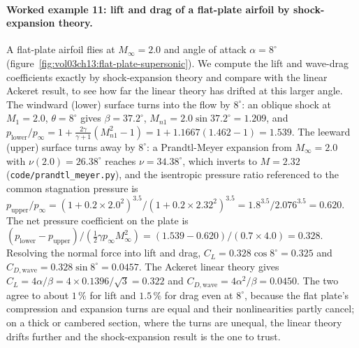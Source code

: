 \paragraph{Worked example 11: lift and drag of a flat-plate airfoil by
shock-expansion theory.} A flat-plate airfoil flies at $M_\infty = 2.0$
and angle of attack $\alpha = 8^{\circ}$
(figure~\ref{fig:vol03ch13:flat-plate-supersonic}). We compute the lift
and wave-drag coefficients exactly by shock-expansion theory and
compare with the linear Ackeret result, to see how far the linear
theory has drifted at this larger angle. The windward (lower) surface
turns into the flow by $8^{\circ}$: an oblique shock at
$M_1 = 2.0$, $\theta = 8^{\circ}$ gives $\beta = 37.2^{\circ}$,
$M_{n1} = 2.0 \sin 37.2^{\circ} = 1.209$, and
$p_{\text{lower}}/p_\infty = 1 + \frac{2\gamma}{\gamma + 1}
(M_{n1}^2 - 1) = 1 + 1.1667(1.462 - 1) = 1.539$. The leeward (upper)
surface turns away by $8^{\circ}$: a Prandtl-Meyer expansion from
$M_\infty = 2.0$ with $\nu(2.0) = 26.38^{\circ}$ reaches
$\nu = 34.38^{\circ}$, which inverts to $M = 2.32$
(\texttt{code/prandtl\_meyer.py}), and the isentropic pressure ratio
referenced to the common stagnation pressure is
$p_{\text{upper}}/p_\infty = (1 + 0.2 \times 2.0^2)^{3.5}/
(1 + 0.2 \times 2.32^2)^{3.5} = 1.8^{3.5}/2.076^{3.5} = 0.620$. The
net pressure coefficient on the plate is
$(p_{\text{lower}} - p_{\text{upper}})/(\tfrac{1}{2}\gamma p_\infty
M_\infty^2) = (1.539 - 0.620)/(0.7 \times 4.0) = 0.328$. Resolving the
normal force into lift and drag,
$C_L = 0.328 \cos 8^{\circ} = 0.325$ and
$C_{D,\text{wave}} = 0.328 \sin 8^{\circ} = 0.0457$. The Ackeret
linear theory gives $C_L = 4\alpha/\beta =
4 \times 0.1396/\sqrt{3} = 0.322$ and
$C_{D,\text{wave}} = 4\alpha^2/\beta = 0.0450$. The two agree to about
$1\,\%$ for lift and $1.5\,\%$ for drag even at $8^{\circ}$, because
the flat plate's compression and expansion turns are equal and their
nonlinearities partly cancel; on a thick or cambered section, where the
turns are unequal, the linear theory drifts further and the
shock-expansion result is the one to trust.

